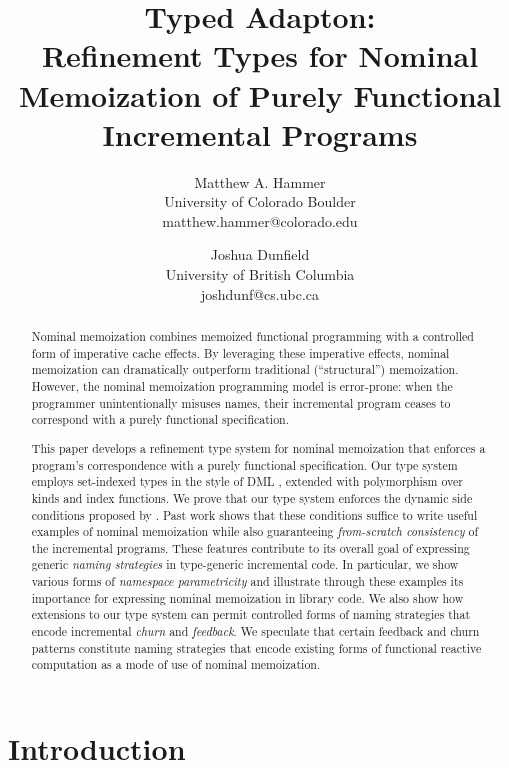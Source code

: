 \documentclass{purple}
\title{Typed Adapton:
  \\
 Refinement Types for Nominal Memoization 
 of Purely Functional Incremental Programs}
\author{
Matthew A. Hammer
\\
University of Colorado Boulder
\\
\textsf{matthew.hammer@colorado.edu} 
\and
Joshua Dunfield
\\
University of British Columbia
\\
\textsf{joshdunf@cs.ubc.ca}
}
\begin{document}
\maketitle

\begin{abstract}
Nominal memoization combines memoized functional programming with a
controlled form of imperative cache effects.
%
By leveraging these imperative effects, nominal memoization can
dramatically outperform traditional (``structural'') memoization.
%
However, the nominal memoization programming model is error-prone:
when the programmer unintentionally misuses names, their incremental
program ceases to correspond with a purely functional specification.

This paper develops a refinement type system for nominal memoization
that enforces a program's correspondence with a purely functional
specification.
%
Our type system employs set-indexed types in the style of DML \citep{Xi99popl},
extended with polymorphism over kinds and index functions.
%
We prove that our type system enforces the dynamic side
conditions proposed by \citet{Hammer15:names}.
%
Past work shows that these conditions suffice to write useful examples
of nominal memoization while also guaranteeing \emph{from-scratch consistency}
of the incremental programs.
%
%
These features contribute to its overall goal of expressing 
generic \emph{naming strategies} 
in type-generic incremental code.
%
In particular, we show various forms of \emph{namespace parametricity}
and illustrate through these examples its importance for expressing
nominal memoization in library code.
%
We also show how extensions to our type system can permit controlled
forms of naming strategies that encode incremental \emph{churn} and
\emph{feedback}.
%
We speculate that certain feedback and churn patterns constitute
naming strategies that encode existing forms of functional reactive
computation as a mode of use of nominal memoization.
\end{abstract}

\section{Introduction}

\end{document}
